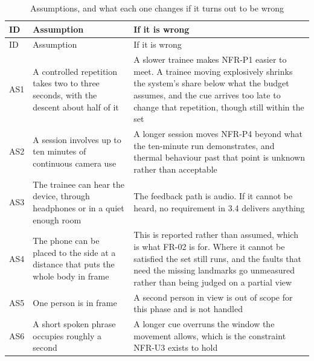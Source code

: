 {\small
\setlength{\LTpre}{6pt}\setlength{\LTpost}{8pt}
\begin{longtable}{>{\raggedright\arraybackslash}p{}>{\raggedright\arraybackslash}p{}>{\raggedright\arraybackslash}p{}}
\caption{Assumptions, and what each one changes if it turns out to be wrong}\\
\toprule
ID & Assumption & If it is wrong \\
\midrule
\endfirsthead
\toprule
ID & Assumption & If it is wrong \\
\midrule
\endhead
\bottomrule
\endfoot
\bottomrule
\endlastfoot
AS1 & A controlled repetition takes two to three seconds, with the descent about half of it & A slower trainee makes NFR-P1 easier to meet. A trainee moving explosively shrinks the system's share below what the budget assumes, and the cue arrives too late to change that repetition, though still within the set \\
AS2 & A session involves up to ten minutes of continuous camera use & A longer session moves NFR-P4 beyond what the ten-minute run demonstrates, and thermal behaviour past that point is unknown rather than acceptable \\
AS3 & The trainee can hear the device, through headphones or in a quiet enough room & The feedback path is audio. If it cannot be heard, no requirement in 3.4 delivers anything \\
AS4 & The phone can be placed to the side at a distance that puts the whole body in frame & This is reported rather than assumed, which is what FR-02 is for. Where it cannot be satisfied the set still runs, and the faults that need the missing landmarks go unmeasured rather than being judged on a partial view \\
AS5 & One person is in frame & A second person in view is out of scope for this phase and is not handled \\
AS6 & A short spoken phrase occupies roughly a second & A longer cue overruns the window the movement allows, which is the constraint NFR-U3 exists to hold \\
\end{longtable}
}
